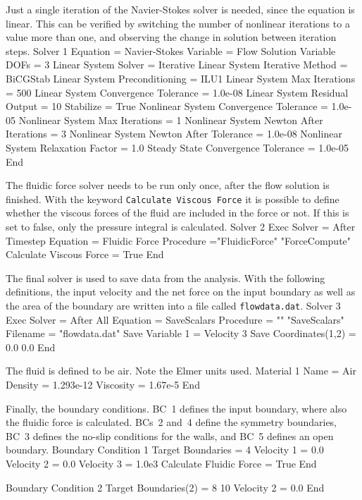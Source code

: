 Just a single iteration of the Navier-Stokes solver is needed, since
the equation is linear. This can be verified by switching the number
of nonlinear iterations to a value more than one, and observing the
change in solution between iteration steps.
\ttbegin
Solver 1
   Equation = Navier-Stokes
   Variable = Flow Solution
   Variable DOFs = 3
   Linear System Solver = Iterative
   Linear System Iterative Method = BiCGStab
   Linear System Preconditioning = ILU1
   Linear System Max Iterations = 500
   Linear System Convergence Tolerance = 1.0e-08
   Linear System Residual Output = 10
   Stabilize = True
   Nonlinear System Convergence Tolerance = 1.0e-05
   Nonlinear System Max Iterations = 1
   Nonlinear System Newton After Iterations = 3
   Nonlinear System Newton After Tolerance = 1.0e-08
   Nonlinear System Relaxation Factor = 1.0
   Steady State Convergence Tolerance = 1.0e-05
End
\ttend

The fluidic force solver needs to be run only once, after the flow
solution is finished. With the keyword {\tt Calculate Viscous Force} it
is possible to define whether the viscous forces of the fluid are
included in the force or not. If this is set to false, only the
pressure integral is calculated.
\ttbegin
Solver 2
  Exec Solver = After Timestep
  Equation = Fluidic Force
  Procedure  ="FluidicForce" "ForceCompute"
  Calculate Viscous Force = True
End
\ttend

The final solver is used to save data from the analysis. With the
following definitions, the input velocity and the net force on the
input boundary as well as the area of the boundary are written into a
file called {\tt flowdata.dat}.
\ttbegin
Solver 3
  Exec Solver = After All
  Equation = SaveScalars
  Procedure = "" "SaveScalars"
  Filename = "flowdata.dat"
  Save Variable 1 = Velocity 3
  Save Coordinates(1,2) = 0.0 0.0
End
\ttend

The fluid is defined to be air. Note the Elmer  units used.
\ttbegin
Material 1
  Name = Air
  Density = 1.293e-12
  Viscosity = 1.67e-5
End
\ttend

Finally, the boundary conditions. BC~1 defines the input boundary,
where also the fluidic force is calculated. BCs~2 and~4 define the
symmetry boundaries, BC~3 defines the no-slip conditions for the
walls, and BC~5 defines an open boundary.
\ttbegin
Boundary Condition 1
  Target Boundaries = 4
   Velocity 1 = 0.0
   Velocity 2 = 0.0
   Velocity 3 = 1.0e3
   Calculate Fluidic Force = True
End

Boundary Condition 2
  Target Boundaries(2) = 8 10
   Velocity 2 = 0.0
End


